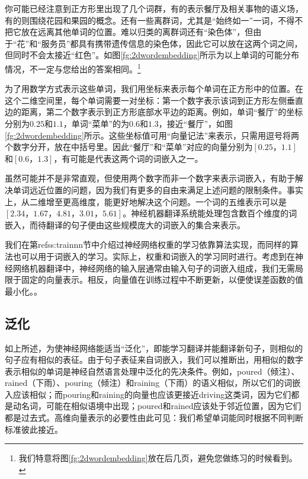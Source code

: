 \documentclass[output=paper,colorlinks,citecolor=brown]{langscibook}
\begin{document}
你可能已经注意到正方形里出现了几个词群，有的表示餐厅及相关事物的语义场，有的则围绕花园和果园的概念。还有一些离群词，尤其是“始终如一”一词，不得不把它放在远离其他单词的位置。难以归类的离群词还有“染色体”，但由于“花”和“服务员”都具有携带遗传信息的染色体，因此它可以放在这两个词之间，但同时不会太接近“红色”。如图\ref{fg:2dwordembedding}所示为以上单词的可能分布情况，不一定与您给出的答案相同。\footnote{我们特意将图\ref{fg:2dwordembedding}放在后几页，避免您做练习的时候看到。}

为了用数学方式表示这些单词，我们用坐标来表示每个单词在正方形中的位置。在这个二维空间里，每个单词需要一对坐标：第一个数字表示该词到正方形左侧垂直边的距离，第二个数字表示到正方形底部水平边的距离。例如，单词“餐厅”的坐标分别为$0.25$和$1.1$，单词“菜单”的为$0.6$和$1.3$，接近“餐厅”，如图\ref{fg:2dwordembedding}所示。这些坐标值可用“向量记法”来表示，只需用逗号将两个数字分开，放在中括号里。因此“餐厅”和“菜单”对应的向量分别为$[0.25，1.1]$和$[0.6，1.3]$，有可能是代表这两个词的词嵌入之一。

虽然可能并不是非常直观，但使用两个数字而非一个数字来表示词嵌入，有助于解决单词远近位置的问题，因为我们有更多的自由来满足上述问题的限制条件。事实上，从二维增至更高维度，能更好地解决这个问题。一个词的五维表示可以是$[2.34，1.67，4.81，3.01，5.61]$。神经机器翻译系统能处理包含数百个维度的词嵌入，而待翻译的句子便由这些规模庞大的词嵌入的集合来表示。

我们在第ref{ss:trainnn}节中介绍过神经网络权重的学习依靠算法实现，而同样的算法也可以用于词嵌入的学习。实际上，权重和词嵌入的学习同时进行。考虑到在神经网络机器翻译中，神经网络的输入层通常由输入句子的词嵌入组成，我们无需局限于固定的向量表示。相反，向量值在训练过程中不断更新，以便使误差函数的值最小化。。


\subsection{泛化}

如上所述，为使神经网络能适当“泛化”，即能学习翻译并能翻译新句子，则相似的句子应有相似的表征。由于句子表征来自词嵌入，我们可以推断出，用相似的数字表示相似的单词是神经自然语言处理中泛化的先决条件。例如，poured（倾注）、rained（下雨）、pouring（倾注）和raining（下雨）的语义相似，所以它们的词嵌入应该相似；而pouring和raining的向量也应该更接近driving这类词，因为它们都是动名词，可能在相似语境中出现；poured和rained应该处于邻近位置，因为它们都是过去式。高维向量表示的必要性由此可见：我们希望单词能同时根据不同判断标准彼此接近。
\end{document}
